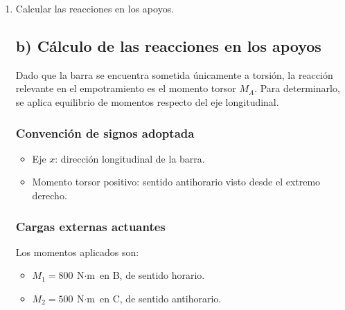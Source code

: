 \documentclass[12pt,a4paper]{article}
\begin{document}
\begin{enumerate}
\begin{figure}[H]
\caption{Diagrama de cuerpo libre de la barra compuesta sometida a torsión pura.}
\label{fig:dcl_completo2}
\end{figure}

\noindent
En este problema de torsión pura, la única reacción externa relevante en el empotramiento es el momento torsor $M_A$, ya que no actúan fuerzas axiales ni transversales sobre la barra.

\item[b)] Calcular las reacciones en los apoyos.

\subsection*{b) Cálculo de las reacciones en los apoyos}

Dado que la barra se encuentra sometida únicamente a torsión, la reacción relevante en el empotramiento es el momento torsor $M_A$. Para determinarlo, se aplica equilibrio de momentos respecto del eje longitudinal.

\subsubsection*{Convención de signos adoptada}
\begin{itemize}
    \item Eje $x$: dirección longitudinal de la barra.
    \item Momento torsor positivo: sentido antihorario visto desde el extremo derecho.
\end{itemize}

\subsubsection*{Cargas externas actuantes}

Los momentos aplicados son:
\begin{itemize}
    \item $M_1 = 800\ \text{N$\cdot$m}$ en B, de sentido horario.
    \item $M_2 = 500\ \text{N$\cdot$m}$ en C, de sentido antihorario.
\end{itemize}


\end{enumerate}
\end{document}
